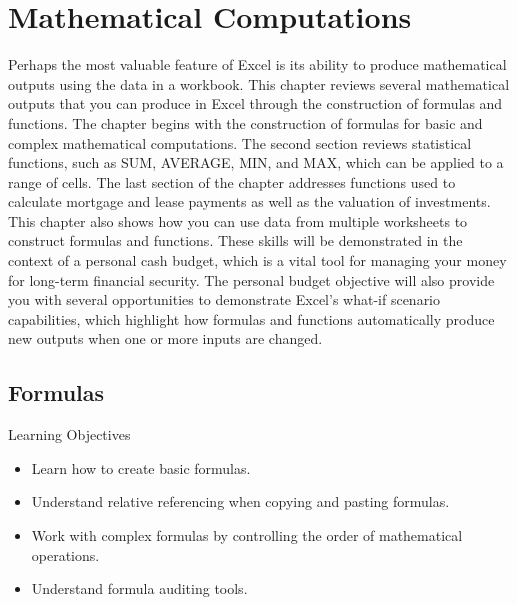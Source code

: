 \chapter{Mathematical Computations}\label{ch02:mathematical_computations}

Perhaps the most valuable feature of Excel is its ability to produce mathematical outputs using the data in a workbook. This chapter reviews several mathematical outputs that you can produce in Excel through the construction of formulas and functions. The chapter begins with the construction of formulas for basic and complex mathematical computations. The second section reviews statistical functions, such as SUM, AVERAGE, MIN, and MAX, which can be applied to a range of cells. The last section of the chapter addresses functions used to calculate mortgage and lease payments as well as the valuation of investments. This chapter also shows how you can use data from multiple worksheets to construct formulas and functions. These skills will be demonstrated in the context of a personal cash budget, which is a vital tool for managing your money for long-term financial security. The personal budget objective will also provide you with several opportunities to demonstrate Excel's what-if scenario capabilities, which highlight how formulas and functions automatically produce new outputs when one or more inputs are changed.

\section{Formulas}

\begin{center}
	\begin{objbox}{Learning Objectives}
		\begin{itemize}
			\setlength{\itemsep}{0pt}
			\setlength{\parskip}{0pt}
			\setlength{\parsep}{0pt}
			
			\item Learn how to create basic formulas.
			\item Understand relative referencing when copying and pasting formulas.
			\item Work with complex formulas by controlling the order of mathematical operations.
			\item Understand formula auditing tools.

		\end{itemize}
	\end{objbox}
\end{center}

